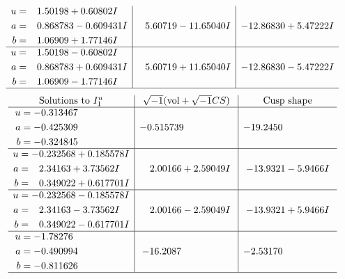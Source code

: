 \documentclass[1p]{elsarticle_modified}
\theoremstyle{definition}
\newcommand{\I}{\sqrt{-1}}
\begin{document}
$$\begin{array}{c|c|c}
\begin{aligned}
u &= \phantom{-}1.50198 + 0.60802 I \\
a &= \phantom{-}0.868783 - 0.609431 I \\
b &= \phantom{-}1.06909 + 1.77146 I\end{aligned}
 & \phantom{-}5.60719 - 11.65040 I & -12.86830 + 5.47222 I \\ \hline\begin{aligned}
u &= \phantom{-}1.50198 - 0.60802 I \\
a &= \phantom{-}0.868783 + 0.609431 I \\
b &= \phantom{-}1.06909 - 1.77146 I\end{aligned}
 & \phantom{-}5.60719 + 11.65040 I & -12.86830 - 5.47222 I\\
 \hline 
 \end{array}$$\newpage$$\begin{array}{c|c|c}  
\text{Solutions to }I^u_{1}& \I (\text{vol} + \sqrt{-1}CS) & \text{Cusp shape}\\
 \hline 
\begin{aligned}
u &= -0.313467\phantom{ +0.000000I} \\
a &= -0.425309\phantom{ +0.000000I} \\
b &= -0.324845\phantom{ +0.000000I}\end{aligned}
 & -0.515739\phantom{ +0.000000I} & -19.2450\phantom{ +0.000000I} \\ \hline\begin{aligned}
u &= -0.232568 + 0.185578 I \\
a &= \phantom{-}2.34163 + 3.73562 I \\
b &= \phantom{-}0.349022 + 0.617701 I\end{aligned}
 & \phantom{-}2.00166 + 2.59049 I & -13.9321 - 5.9466 I \\ \hline\begin{aligned}
u &= -0.232568 - 0.185578 I \\
a &= \phantom{-}2.34163 - 3.73562 I \\
b &= \phantom{-}0.349022 - 0.617701 I\end{aligned}
 & \phantom{-}2.00166 - 2.59049 I & -13.9321 + 5.9466 I \\ \hline\begin{aligned}
u &= -1.78276\phantom{ +0.000000I} \\
a &= -0.490994\phantom{ +0.000000I} \\
b &= -0.811626\phantom{ +0.000000I}\end{aligned}
 & -16.2087\phantom{ +0.000000I} & -2.53170\phantom{ +0.000000I}\\
 \hline 
 \end{array}$$\newpage\newpage\renewcommand{\arraystretch}{1}
\end{document}
